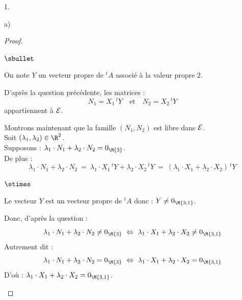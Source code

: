 \begin{noliste}{1.}
\begin{noliste}{a)}
\begin{proof}
\begin{noliste}{$\sbullet$}

	  \item On note $Y$ un vecteur propre de ${}^t A$ associé à 
	  la valeur propre $2$.
	  
	  \item D'après la question précédente, les matrices :
	  \[
	    N_1 = X_1 \, {}^t Y \quad \text{et} \quad N_2 = X_2 \, 
	    {}^t Y
	  \]
	  appartiennent à ${\cal E}$. 
	  
	  \item Montrons maintenant que la famille $(N_1,N_2)$ est 
	  libre dans ${\cal E}$.\\
	  Soit $(\lambda_1,\lambda_2) \in \R^2$.\\
	  Supposons : $\lambda_1 \cdot N_1 + \lambda_2 \cdot N_2 =
	  0_{\M{3}}$.\\
	  De plus :
	  \[
          \lambda_1 \cdot N_1 + \lambda_2 \cdot N_2 \ = \ \lambda_1
          \cdot X_1 \, {}^tY + \lambda_2 \cdot X_2 \, {}^t Y \ = \
          (\lambda_1 \cdot X_1 + \lambda_2 \cdot X_2) \, {}^t Y
	  \]
	  \begin{noliste}{$\stimes$}
	    \item Le vecteur $Y$ est un vecteur propre de ${}^t A$ 
	    donc : $Y \neq 0_{\M{3,1}}$.
	    
	    \item Donc, d'après la question  :
	    \[
	      \lambda_1 \cdot N_1 + \lambda_2 \cdot N_2 \neq 
	      0_{\M{3}} \ \Leftrightarrow \ 
	      \lambda_1 \cdot X_1 + \lambda_2 \cdot X_2 \neq 
	      0_{\M{3,1}}
	    \]
	    Autrement dit :
	    \[
	      \lambda_1 \cdot N_1 + \lambda_2 \cdot N_2 = 
	      0_{\M{3}} \ \Leftrightarrow \ 
	      \lambda_1 \cdot X_1 + \lambda_2 \cdot X_2 = 
	      0_{\M{3,1}}
	    \]
	    D'où : $\lambda_1 \cdot X_1 + \lambda_2 \cdot X_2 = 
	      0_{\M{3,1}}$.
	      

\end{noliste}
\end{noliste}
\end{proof}
\end{noliste}
\end{noliste}
